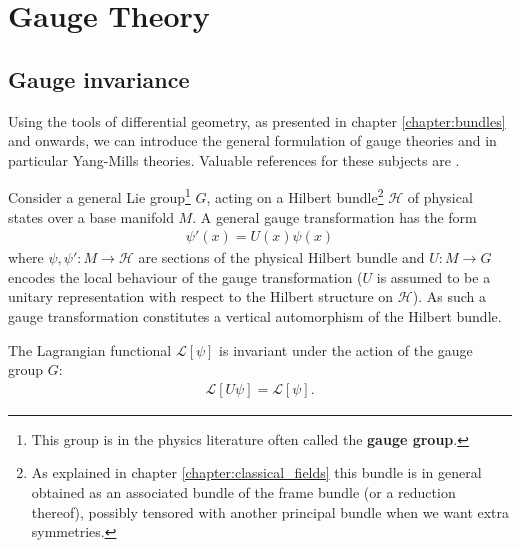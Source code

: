 \chapter{Gauge Theory}

\section{Gauge invariance}

    Using the tools of differential geometry, as presented in chapter \ref{chapter:bundles} and onwards, we can introduce the general formulation of gauge theories and in particular Yang-Mills theories. Valuable references for these subjects are \cite{principal_bundles,sen_nash,schuller,gauge1}.

    Consider a general Lie group\footnote{This group is in the physics literature often called the \textbf{gauge group}.} $G$, acting on a Hilbert bundle\footnote{As explained in chapter \ref{chapter:classical_fields} this bundle is in general obtained as an associated bundle of the frame bundle (or a reduction thereof), possibly tensored with another principal bundle when we want extra symmetries.} $\mathcal{H}$ of physical states over a base manifold $M$. A general gauge transformation has the form
    \begin{gather}
        \label{qft:gauge_transformation}
        \psi'(x) = U(x)\psi(x)
    \end{gather}
    where $\psi, \psi':M\rightarrow\mathcal{H}$ are sections of the physical Hilbert bundle and $U:M\rightarrow G$ encodes the local behaviour of the gauge transformation ($U$ is assumed to be a unitary representation with respect to the Hilbert structure on $\mathcal{H}$). As such a gauge transformation constitutes a vertical automorphism of the Hilbert bundle.

    \begin{axiom}
        The Lagrangian functional $\mathcal{L}[\psi]$ is invariant under the action of the gauge group $G$:
        \begin{gather}
            \mathcal{L}[U\psi] = \mathcal{L}[\psi].
        \end{gather}
    \end{axiom}

